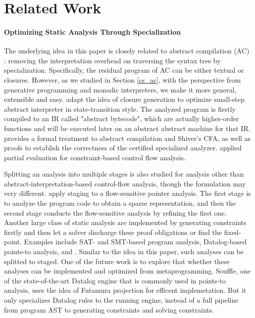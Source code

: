 \section{Related Work}

\paragraph{Optimizing Static Analysis Through Specialization}
The underlying idea in this paper is closely related to abstract compilation (AC)
\cite{Boucher:1996:ACN:647473.727587}: removing the interpretation overhead on
traversing the syntax tree by specialization. Specifically, the residual program
of AC can be either textual or closures. However, as we studied in Section
\ref{cs_ac}, with the perspective from generative programming and monadic
interpreters, we make it more general, extensible and easy.
\citet{Johnson:2013:OAA:2500365.2500604} adapt the idea of closure
generation to optimize small-step abstract interpreter in state-transition
style. The analyzed program is firstly compiled to an IR called "abstract
bytecode", which are actually higher-order functions and will be executed later
on an abstract abstract machine for that IR. \citet{damian1999partial} provides a
formal treatment to abstract compilation and Shiver's CFA, as well as proofs to
establish the correctness of the certified specialized analyzer.
\citet{amtoft1999partial} applied partial evaluation for constraint-based
control flow analysis.

Splitting an analysis into multiple stages is also studied for analysis other
than abstract-interpretation-based control-flow analysis, though the formulation may
very different. \citet{DBLP:conf/cgo/HardekopfL11} apply staging to a
flow-sensitive pointer analysis. The first stage is to analyze the program code
to obtain a sparse representation, and then the second stage conducts the
flow-sensitive analysis by refining the first one. Another large class of static
analysis are implemented by generating constraints firstly and then let a solver
discharge these proof obligations or find the fixed-point. Examples include SAT-
and SMT-based program analysis, Datalog-based points-to
analysis, and \todo{}. Similar to the idea in this paper, such
analyses can be splitted to staged.
One of the future work is to explore that whether these analyses can be
implemented and optimized from metaprogramming. Souffle, one of the
state-of-the-art Datalog engine that is commonly used in points-to analysis,
uses the idea of Futamura projection for efficent implemetation. But it only
specializes Datalog rules to the running engine, instead of a full pipeline from
program AST to generating constraints and solving constraints.

